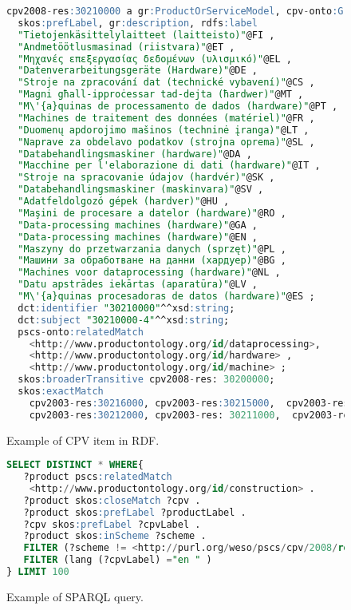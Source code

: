 \begin{figure}[!ht]
\begin{lstlisting}[language=SQL,basicstyle=\ttfamily\footnotesize]  
cpv2008-res:30210000 a gr:ProductOrServiceModel, cpv-onto:Group;
  skos:prefLabel, gr:description, rdfs:label 	
  "Tietojenkäsittelylaitteet (laitteisto)"@FI ,
  "Andmetöötlusmasinad (riistvara)"@ET , 
  "Μηχανές επεξεργασίας δεδομένων (υλισμικό)"@EL , 
  "Datenverarbeitungsgeräte (Hardware)"@DE , 
  "Stroje na zpracování dat (technické vybavení)"@CS ,
  "Magni għall-ipproċessar tad-dejta (ħardwer)"@MT , 
  "M\'{a}quinas de processamento de dados (hardware)"@PT , 
  "Machines de traitement des données (matériel)"@FR ,
  "Duomenų apdorojimo mašinos (techninė įranga)"@LT , 
  "Naprave za obdelavo podatkov (strojna oprema)"@SL , 
  "Databehandlingsmaskiner (hardware)"@DA ,
  "Macchine per l'elaborazione di dati (hardware)"@IT ,
  "Stroje na spracovanie údajov (hardvér)"@SK , 
  "Databehandlingsmaskiner (maskinvara)"@SV ,
  "Adatfeldolgozó gépek (hardver)"@HU ,
  "Maşini de procesare a datelor (hardware)"@RO , 
  "Data-processing machines (hardware)"@GA ,
  "Data-processing machines (hardware)"@EN ,
  "Maszyny do przetwarzania danych (sprzęt)"@PL , 
  "Машини за обработване на данни (хардуер)"@BG ,
  "Machines voor dataprocessing (hardware)"@NL , 
  "Datu apstrādes iekārtas (aparatūra)"@LV ,
  "M\'{a}quinas procesadoras de datos (hardware)"@ES ;
  dct:identifier "30210000"^^xsd:string;
  dct:subject "30210000-4"^^xsd:string;
  pscs-onto:relatedMatch   
    <http://www.productontology.org/id/dataprocessing>,
    <http://www.productontology.org/id/hardware> ,
    <http://www.productontology.org/id/machine> ;	
  skos:broaderTransitive cpv2008-res: 30200000;
  skos:exactMatch 
    cpv2003-res:30216000, cpv2003-res:30215000,  cpv2003-res:30213000,   
    cpv2003-res:30212000, cpv2003-res: 30211000,  cpv2003-res:30214000.
\end{lstlisting}
\caption{Example of CPV item in RDF.}
 \label{fig:example-cpv-code}
\end{figure}


\begin{figure}[!ht]
\begin{lstlisting}[language=SQL,basicstyle=\ttfamily\footnotesize]  
SELECT DISTINCT * WHERE{
   ?product pscs:relatedMatch 
    <http://www.productontology.org/id/construction> .
   ?product skos:closeMatch ?cpv .
   ?product skos:prefLabel ?productLabel .
   ?cpv skos:prefLabel ?cpvLabel .
   ?product skos:inScheme ?scheme .
   FILTER (?scheme != <http://purl.org/weso/pscs/cpv/2008/resource/ds>) .
   FILTER (lang (?cpvLabel) ="en " )
} LIMIT 100
\end{lstlisting}
\caption{Example of SPARQL query.}
 \label{fig:example-sparql-query}
\end{figure}

